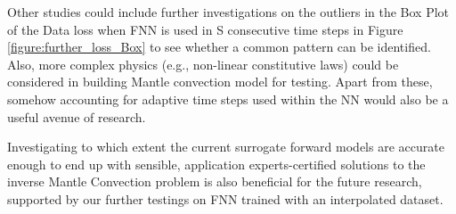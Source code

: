Other studies could include further investigations on the outliers in the Box Plot of the Data loss when FNN is used in S consecutive time steps in Figure \ref{figure:further_loss_Box} to see whether a common pattern can be identified. Also, more complex physics (e.g., non-linear constitutive laws) could be considered in building Mantle convection model for testing. Apart from these, somehow accounting for adaptive time steps used within the NN would also be a useful avenue of research.

Investigating to which extent the current surrogate forward models are accurate enough to end up with sensible, application experts-certified solutions to the inverse Mantle Convection problem is also beneficial for the future research, supported by our further testings on FNN trained with an interpolated dataset.